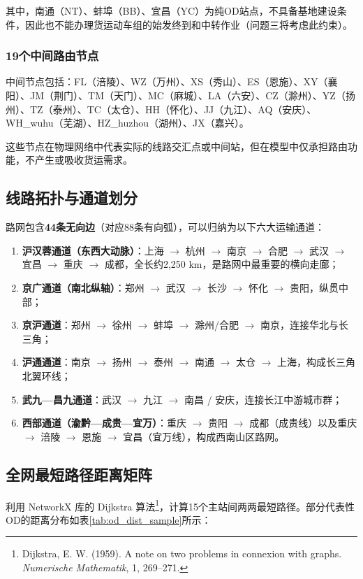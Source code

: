 \documentclass[12pt,a4paper,fontset=none]{ctexart}
\begin{document}
其中，南通（NT）、蚌埠（BB）、宜昌（YC）为纯OD站点，不具备基地建设条件，因此也不能办理货运动车组的始发终到和中转作业（问题三将考虑此约束）。

\subsubsection*{19个中间路由节点}

中间节点包括：FL（涪陵）、WZ（万州）、XS（秀山）、ES（恩施）、XY（襄阳）、JM（荆门）、TM（天门）、MC（麻城）、LA（六安）、CZ（滁州）、YZ（扬州）、TZ（泰州）、TC（太仓）、HH（怀化）、JJ（九江）、AQ（安庆）、WH\_wuhu（芜湖）、HZ\_huzhou（湖州）、JX（嘉兴）。

这些节点在物理网络中代表实际的线路交汇点或中间站，但在模型中仅承担路由功能，不产生或吸收货运需求。

\subsection{线路拓扑与通道划分}

路网包含\textbf{44条无向边}（对应88条有向弧），可以归纳为以下六大运输通道：

\begin{enumerate}[leftmargin=*]
    \item \textbf{沪汉蓉通道（东西大动脉）}：上海 $\to$ 杭州 $\to$ 南京 $\to$ 合肥 $\to$ 武汉 $\to$ 宜昌 $\to$ 重庆 $\to$ 成都，全长约2,250 km，是路网中最重要的横向走廊；
    \item \textbf{京广通道（南北纵轴）}：郑州 $\to$ 武汉 $\to$ 长沙 $\to$ 怀化 $\to$ 贵阳，纵贯中部；
    \item \textbf{京沪通道}：郑州 $\to$ 徐州 $\to$ 蚌埠 $\to$ 滁州/合肥 $\to$ 南京，连接华北与长三角；
    \item \textbf{沪通通道}：南京 $\to$ 扬州 $\to$ 泰州 $\to$ 南通 $\to$ 太仓 $\to$ 上海，构成长三角北翼环线；
    \item \textbf{武九—昌九通道}：武汉 $\to$ 九江 $\to$ 南昌 / 安庆，连接长江中游城市群；
    \item \textbf{西部通道（渝黔—成贵—宜万）}：重庆 $\to$ 贵阳 $\to$ 成都（成贵线）以及重庆 $\to$ 涪陵 $\to$ 恩施 $\to$ 宜昌（宜万线），构成西南山区路网。
\end{enumerate}

\subsection{全网最短路径距离矩阵}

利用 NetworkX 库的 Dijkstra 算法\footnote{Dijkstra, E. W. (1959). A note on two problems in connexion with graphs. \textit{Numerische Mathematik}, 1, 269--271.}，计算15个主站间两两最短路径。部分代表性OD的距离分布如表\ref{tab:od_dist_sample}所示：
\end{document}
